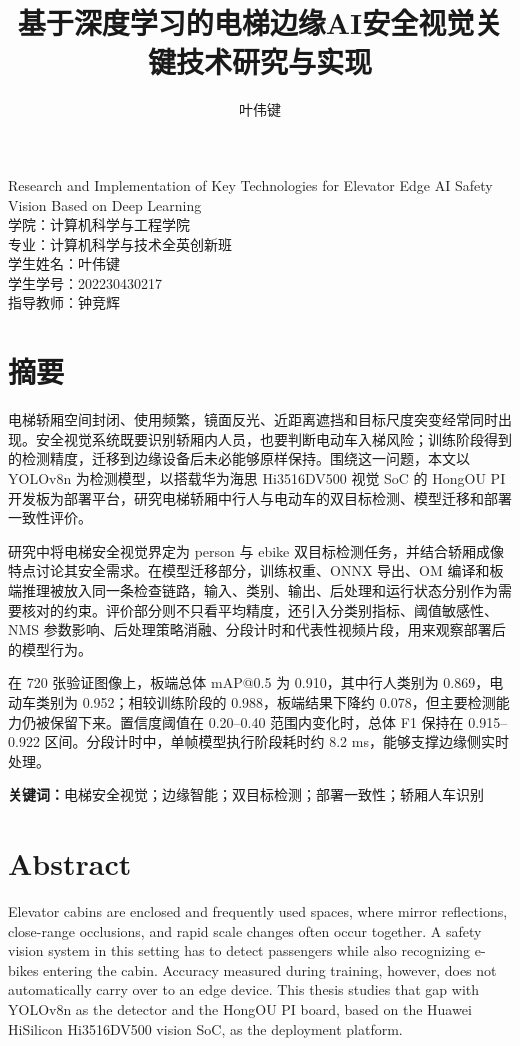 \documentclass{ctexbook}
\title{基于深度学习的电梯边缘AI安全视觉关键技术研究与实现}
\author{叶伟键}
\date{}
\begin{document}
\maketitle
\begin{center}
Research and Implementation of Key Technologies for Elevator Edge AI Safety Vision Based on Deep Learning\\
学院：计算机科学与工程学院\\
专业：计算机科学与技术全英创新班\\
学生姓名：叶伟键\\
学生学号：202230430217\\
指导教师：钟竞辉
\end{center}

\chapter*{摘要}
电梯轿厢空间封闭、使用频繁，镜面反光、近距离遮挡和目标尺度突变经常同时出现。安全视觉系统既要识别轿厢内人员，也要判断电动车入梯风险；训练阶段得到的检测精度，迁移到边缘设备后未必能够原样保持。围绕这一问题，本文以 YOLOv8n 为检测模型，以搭载华为海思 Hi3516DV500 视觉 SoC 的 HongOU PI 开发板为部署平台，研究电梯轿厢中行人与电动车的双目标检测、模型迁移和部署一致性评价。

研究中将电梯安全视觉界定为 person 与 ebike 双目标检测任务，并结合轿厢成像特点讨论其安全需求。在模型迁移部分，训练权重、ONNX 导出、OM 编译和板端推理被放入同一条检查链路，输入、类别、输出、后处理和运行状态分别作为需要核对的约束。评价部分则不只看平均精度，还引入分类别指标、阈值敏感性、NMS 参数影响、后处理策略消融、分段计时和代表性视频片段，用来观察部署后的模型行为。

在 720 张验证图像上，板端总体 mAP@0.5 为 0.910，其中行人类别为 0.869，电动车类别为 0.952；相较训练阶段的 0.988，板端结果下降约 0.078，但主要检测能力仍被保留下来。置信度阈值在 0.20--0.40 范围内变化时，总体 F1 保持在 0.915--0.922 区间。分段计时中，单帧模型执行阶段耗时约 8.2 ms，能够支撑边缘侧实时处理。

\noindent\textbf{关键词：}电梯安全视觉；边缘智能；双目标检测；部署一致性；轿厢人车识别

\chapter*{Abstract}
Elevator cabins are enclosed and frequently used spaces, where mirror reflections, close-range occlusions, and rapid scale changes often occur together. A safety vision system in this setting has to detect passengers while also recognizing e-bikes entering the cabin. Accuracy measured during training, however, does not automatically carry over to an edge device. This thesis studies that gap with YOLOv8n as the detector and the HongOU PI board, based on the Huawei HiSilicon Hi3516DV500 vision SoC, as the deployment platform.
\end{document}
